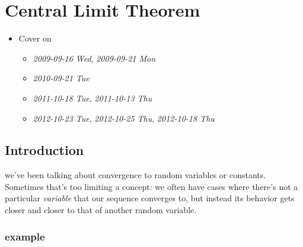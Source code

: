 
\chapter{Central Limit Theorem}

\begin{itemize}
\item Cover on
\begin{itemize}
\item \textit{2009-09-16 Wed}, \textit{2009-09-21 Mon}
\item \textit{2010-09-21 Tue}
\item \textit{2011-10-18 Tue}, \textit{2011-10-13 Thu}
\item \textit{2012-10-23 Tue}, \textit{2012-10-25 Thu}, \textit{2012-10-18 Thu}
\end{itemize}
\end{itemize}
\section{Introduction}
\label{sec-1}

    we've been talking about convergence to random variables or
    constants.  Sometimes that's too limiting a concept: we often have
    cases where there's not a particular \emph{variable} that our sequence
    converges to, but instead its behavior gets closer and closer to
    that of another random variable.  
\subsection{example}
\label{sec-1-1}


